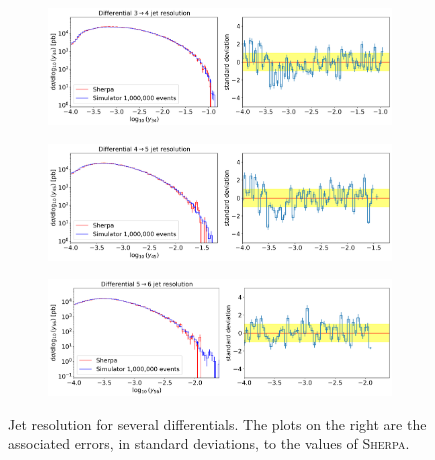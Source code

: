 \clearpage

\begin{figure}[ht!]
    \centering
    \begin{subfigure}[t]{\textwidth}
        \centering
        \includegraphics[width=\textwidth]{figures/jet_histo_2.png}
        \caption{}
        \label{fig:jet2}
    \end{subfigure}
    \hfill
    \begin{subfigure}[t]{\textwidth}
        \centering
        \includegraphics[width=\textwidth]{figures/jet_histo_3.png}
        \caption{}
        \label{fig:jet3}
    \end{subfigure}
    \hfill
    \begin{subfigure}[t]{\textwidth}
        \centering
        \includegraphics[width=\textwidth]{figures/jet_histo_4.png}
        \caption{}
        \label{fig:jet4}
    \end{subfigure}
    \caption{Jet resolution for several differentials. The plots on the right are the associated errors, in standard deviations, to the values of \textsc{Sherpa}.}
    \label{fig:jets}
\end{figure}